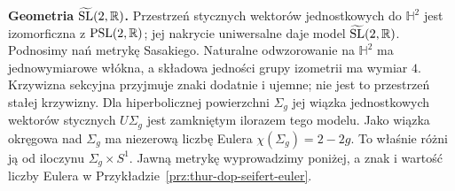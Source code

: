\textbf{Geometria $\widetilde{\mathrm{SL}}(2,\mathbb{R})$.}
Przestrzeń stycznych wektorów jednostkowych do
$\mathbb H^2$ jest izomorficzna z $\mathrm{PSL}(2,\mathbb{R})$;
jej nakrycie uniwersalne daje model
$\widetilde{\mathrm{SL}}(2,\mathbb{R})$.
Podnosimy nań metrykę Sasakiego. Naturalne odwzorowanie
na $\mathbb H^2$ ma jednowymiarowe włókna, a składowa
jedności grupy izometrii ma wymiar $4$.
Krzywizna sekcyjna przyjmuje znaki dodatnie i ujemne;
nie jest to przestrzeń stałej krzywizny.
Dla hiperbolicznej powierzchni $\Sigma_g$ jej wiązka
jednostkowych wektorów stycznych $U\Sigma_g$ jest zamkniętym
ilorazem tego modelu. Jako wiązka okręgowa nad $\Sigma_g$
ma niezerową liczbę Eulera $\chi(\Sigma_g)=2-2g$.
To właśnie różni ją od iloczynu $\Sigma_g\times S^1$.
Jawną metrykę wyprowadzimy poniżej, a znak i wartość liczby
Eulera w Przykładzie~\ref{prz:thur-dop-seifert-euler}.

